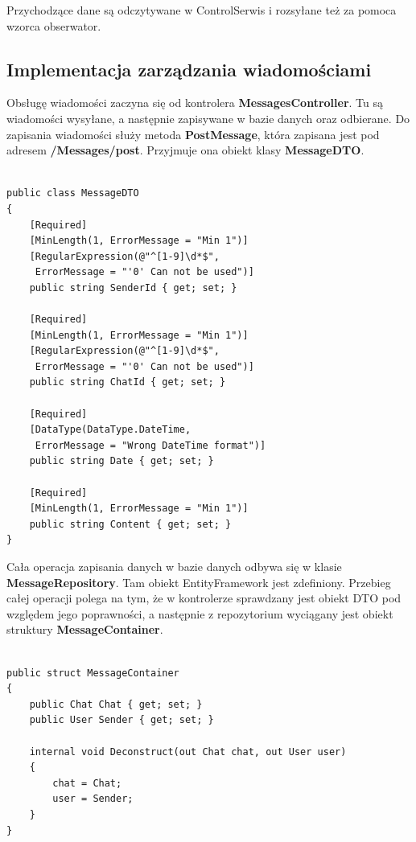 \documentclass[12pt,a4paper]{article}
\begin{document}
Przychodzące dane są odczytywane w ControlSerwis i rozsyłane też za pomoca wzorca obserwator.

\subsection{Implementacja zarządzania wiadomościami}
\hspace*{0.7cm} Obsługę wiadomości zaczyna się od kontrolera \textbf{MessagesController}. Tu są wiadomości wysyłane, a następnie zapisywane w bazie danych oraz odbierane. Do zapisania wiadomości służy metoda \textbf{PostMessage}, która zapisana jest pod adresem \textbf{/Messages/post}. Przyjmuje ona obiekt klasy \textbf{MessageDTO}.

\begin{lstlisting}[caption={Implementacja klasy MessageDTO}]

public class MessageDTO
{
	[Required]
	[MinLength(1, ErrorMessage = "Min 1")]
	[RegularExpression(@"^[1-9]\d*$",
	 ErrorMessage = "'0' Can not be used")]
	public string SenderId { get; set; }
	
	[Required]
	[MinLength(1, ErrorMessage = "Min 1")]
	[RegularExpression(@"^[1-9]\d*$",
	 ErrorMessage = "'0' Can not be used")]
	public string ChatId { get; set; }
	
	[Required]
	[DataType(DataType.DateTime,
	 ErrorMessage = "Wrong DateTime format")]
	public string Date { get; set; }
	
	[Required]
	[MinLength(1, ErrorMessage = "Min 1")]
	public string Content { get; set; }
}
\end{lstlisting}

Cała operacja zapisania danych w bazie danych odbywa się w klasie \textbf{MessageRepository}. Tam obiekt EntityFramework jest zdefiniony. \newline
Przebieg całej operacji polega na tym, że w kontrolerze sprawdzany jest obiekt DTO pod względem jego poprawności, a następnie z repozytorium wyciągany jest obiekt struktury \textbf{MessageContainer}.

\begin{lstlisting}[caption={Implementacja struktury MessageContainer}]

public struct MessageContainer
{
	public Chat Chat { get; set; }
	public User Sender { get; set; }
	
	internal void Deconstruct(out Chat chat, out User user)
	{
		chat = Chat;
		user = Sender;
	}
}
\end{lstlisting}
\end{document}
